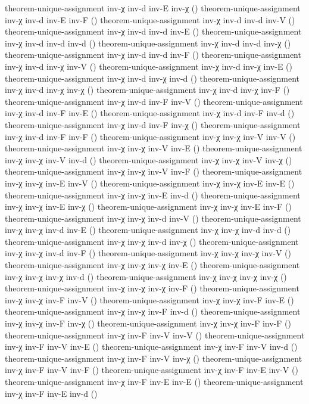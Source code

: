 \documentclass[11pt,a4paper]{article}
\begin{document}
\begin{code}
theorem-unique-assignment inv-χ inv-d inv-E inv-χ ()
theorem-unique-assignment inv-χ inv-d inv-E inv-F ()
theorem-unique-assignment inv-χ inv-d inv-d inv-V ()
theorem-unique-assignment inv-χ inv-d inv-d inv-E ()
theorem-unique-assignment inv-χ inv-d inv-d inv-d ()
theorem-unique-assignment inv-χ inv-d inv-d inv-χ ()
theorem-unique-assignment inv-χ inv-d inv-d inv-F ()
theorem-unique-assignment inv-χ inv-d inv-χ inv-V ()
theorem-unique-assignment inv-χ inv-d inv-χ inv-E ()
theorem-unique-assignment inv-χ inv-d inv-χ inv-d ()
theorem-unique-assignment inv-χ inv-d inv-χ inv-χ ()
theorem-unique-assignment inv-χ inv-d inv-χ inv-F ()
theorem-unique-assignment inv-χ inv-d inv-F inv-V ()
theorem-unique-assignment inv-χ inv-d inv-F inv-E ()
theorem-unique-assignment inv-χ inv-d inv-F inv-d ()
theorem-unique-assignment inv-χ inv-d inv-F inv-χ ()
theorem-unique-assignment inv-χ inv-d inv-F inv-F ()
theorem-unique-assignment inv-χ inv-χ inv-V inv-V ()
theorem-unique-assignment inv-χ inv-χ inv-V inv-E ()
theorem-unique-assignment inv-χ inv-χ inv-V inv-d ()
theorem-unique-assignment inv-χ inv-χ inv-V inv-χ ()
theorem-unique-assignment inv-χ inv-χ inv-V inv-F ()
theorem-unique-assignment inv-χ inv-χ inv-E inv-V ()
theorem-unique-assignment inv-χ inv-χ inv-E inv-E ()
theorem-unique-assignment inv-χ inv-χ inv-E inv-d ()
theorem-unique-assignment inv-χ inv-χ inv-E inv-χ ()
theorem-unique-assignment inv-χ inv-χ inv-E inv-F ()
theorem-unique-assignment inv-χ inv-χ inv-d inv-V ()
theorem-unique-assignment inv-χ inv-χ inv-d inv-E ()
theorem-unique-assignment inv-χ inv-χ inv-d inv-d ()
theorem-unique-assignment inv-χ inv-χ inv-d inv-χ ()
theorem-unique-assignment inv-χ inv-χ inv-d inv-F ()
theorem-unique-assignment inv-χ inv-χ inv-χ inv-V ()
theorem-unique-assignment inv-χ inv-χ inv-χ inv-E ()
theorem-unique-assignment inv-χ inv-χ inv-χ inv-d ()
theorem-unique-assignment inv-χ inv-χ inv-χ inv-χ ()
theorem-unique-assignment inv-χ inv-χ inv-χ inv-F ()
theorem-unique-assignment inv-χ inv-χ inv-F inv-V ()
theorem-unique-assignment inv-χ inv-χ inv-F inv-E ()
theorem-unique-assignment inv-χ inv-χ inv-F inv-d ()
theorem-unique-assignment inv-χ inv-χ inv-F inv-χ ()
theorem-unique-assignment inv-χ inv-χ inv-F inv-F ()
theorem-unique-assignment inv-χ inv-F inv-V inv-V ()
theorem-unique-assignment inv-χ inv-F inv-V inv-E ()
theorem-unique-assignment inv-χ inv-F inv-V inv-d ()
theorem-unique-assignment inv-χ inv-F inv-V inv-χ ()
theorem-unique-assignment inv-χ inv-F inv-V inv-F ()
theorem-unique-assignment inv-χ inv-F inv-E inv-V ()
theorem-unique-assignment inv-χ inv-F inv-E inv-E ()
theorem-unique-assignment inv-χ inv-F inv-E inv-d ()

\end{code}
\end{document}
